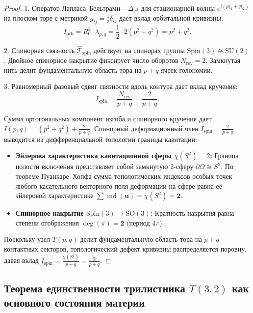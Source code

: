 \documentclass[11pt,a4paper]{article}
\theoremstyle{definition}
\theoremstyle{remark}
\begin{document}
	
\begin{proof}
	1. Оператор Лапласа--Бельтрами $-\Delta_{T^2}$ для стационарной волны $e^{i(p\xi_1 + q\xi_2)}$ на плоском торе с метрикой $g_{ij} = \frac{1}{2}\delta_{ij}$ дает вклад орбитальной кривизны:
\begin{equation}
	I_{\mathrm{orb}} = R_0^2 \cdot \lambda_{p,q} = \frac{1}{2} \cdot 2(p^2 + q^2) = p^2 + q^2.
\end{equation}

2. Спинорная связность $\hat{\mathcal{T}}_{\mathrm{spin}}$ действует на спинорах группы $\mathrm{Spin}(3) \cong \mathrm{SU}(2)$. Двойное спинорное накрытие фиксирует число оборотов $N_{\mathrm{rev}} = 2$. Замкнутая нить делит фундаментальную область тора на $p+q$ ячеек голономии.

3. Равномерный фазовый сдвиг связности вдоль контура дает вклад кручения:
\begin{equation}
	I_{\mathrm{spin}} = \frac{N_{\mathrm{rev}}}{p + q} = \frac{2}{p + q}.
\end{equation}

Сумма ортогональных компонент изгиба и спинорного кручения дает $I(p, q) = (p^2 + q^2) + \frac{2}{p+q}$.
Спинорный деформационный член $I_{\mathrm{spin}} = \frac{2}{p+q}$ выводится из дифференциальной топологии границы кавитации:
\begin{itemize}
\item \textbf{Эйлерова характеристика кавитационной сферы $\chi(S^2) = 2$:} Граница полости включения представляет собой замкнутую 2-сферу $\partial\Omega \cong S^2$. По теореме Пуанкаре--Хопфа сумма топологических индексов особых точек любого касательного векторного поля деформации на сфере равна её эйлеровой характеристике $\sum \operatorname{ind}(\mathbf{u}) = \chi(S^2) = \mathbf{2}$.
\item \textbf{Спинорное накрытие $\mathrm{Spin}(3) \to \mathrm{SO}(3)$:} Кратность накрытия равна степени отображения $\deg(\pi) = \mathbf{2}$ (период $4\pi$).
\end{itemize}
Поскольку узел $T(p,q)$ делит фундаментальную область тора на $p+q$ контактных секторов, топологический дефект кривизны распределяется поровну, давая вклад $I_{\mathrm{spin}} = \frac{\chi(S^2)}{p+q} = \frac{\mathbf{2}}{p+q}$.

\end{proof}
	
\subsection{Теорема единственности трилистника $T(3,2)$ как основного состояния материи}
	
\end{document}
